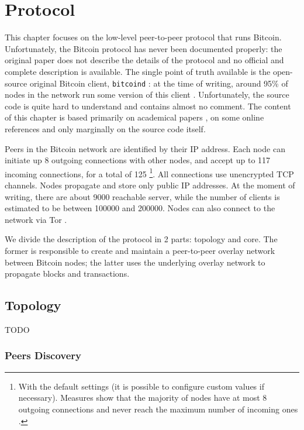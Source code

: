 \chapter{Protocol}
\label{chapter:protocol}
This chapter focuses on the low-level peer-to-peer protocol that runs Bitcoin.
Unfortunately, the Bitcoin protocol has never been documented properly:
the original paper \cite{bitcoin_2009} does not describe the details of the protocol and no official and complete description is available.
The single point of truth available is the open-source original Bitcoin client, \texttt{bitcoind} \cite{bitcoin_github}:
at the time of writing, around \num{95}\% of nodes in the network run some version of this client \cite{bitnodes}.
Unfortunately, the source code is quite hard to understand and contains almost no comment.
The content of this chapter is based primarily on academical papers \cite{eclipse_attack_2015, deanonymization_2014}, on some online references \cite{bitcoin_reference, bitcoin_guide} and only marginally on the source code itself.

\bigskip
Peers in the Bitcoin network are identified by their IP address.
Each node can initiate up \num{8} outgoing connections with other nodes, and accept up to \num{117} incoming connections, for a total of \num{125} \footnote{With the default settings (it is possible to configure custom values if necessary). Measures show that the majority of nodes have at most \num{8} outgoing connections and never reach the maximum number of incoming ones \cite{discovering_influential_nodes_2014}.}.
All connections use unencrypted TCP channels.
Nodes propagate and store only public IP addresses.
At the moment of writing, there are about \num{9000} reachable server, while the number of clients is estimated to be between \num{100000} and \num{200000}.
Nodes can also connect to the network via Tor \cite{bicoin_tor}.

\bigskip
We divide the description of the protocol in \num{2} parts: topology and core.
The former is responsible to create and maintain a peer-to-peer overlay network between Bitcoin nodes;
the latter uses the underlying overlay network to propagate blocks and transactions.

\section{Topology}
TODO

\subsection{Peers Discovery}
\label{sec:discovery}

